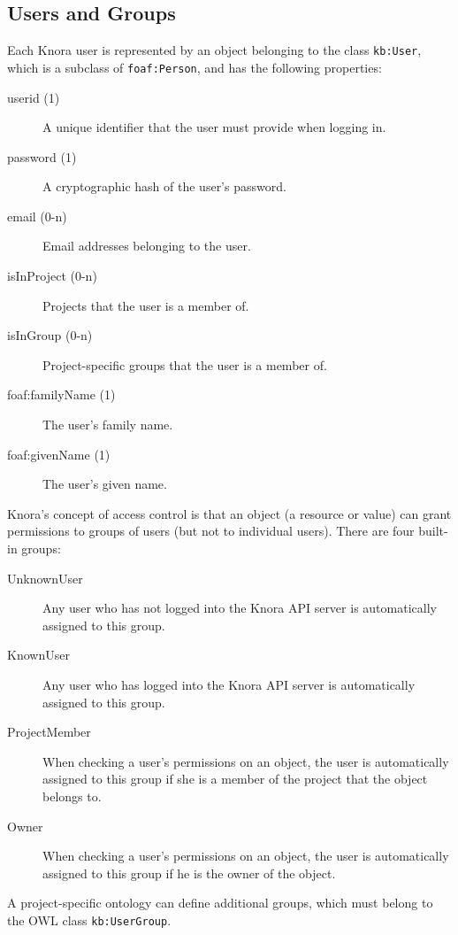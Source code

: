\documentclass[12pt, a4paper]{article}
\begin{document}
\label{sec:authorization}

\subsection{Users and Groups}

\label{subsec:users-and-groups}

Each Knora user is represented by an object belonging to the class \texttt{kb:User}, which is a subclass of \texttt{foaf:Person}, and has the following properties:

\begin{description}
	\item[userid (1)] A unique identifier that the user must provide when logging in.
	\item[password (1)] A cryptographic hash of the user's password.
	\item[email (0-n)] Email addresses belonging to the user.
	\item[isInProject (0-n)] Projects that the user is a member of.
	\item[isInGroup (0-n)] Project-specific groups that the user is a member of.
	\item[foaf:familyName (1)] The user's family name.
	\item[foaf:givenName (1)] The user's given name.
\end{description}

Knora's concept of access control is that an object (a resource or value) can grant permissions to groups of users (but not to individual users). There are four built-in groups:

\begin{description}
	\item[UnknownUser] Any user who has not logged into the Knora API server is automatically assigned to this group.
	\item[KnownUser] Any user who has logged into the Knora API server is automatically assigned to this group.
	\item[ProjectMember] When checking a user's permissions on an object, the user is automatically assigned to this group if she is a member of the project that the object belongs to.
	\item[Owner] When checking a user's permissions on an object, the user is automatically assigned to this group if he is the owner of the object.
\end{description}

A project-specific ontology can define additional groups, which must belong to the OWL class \texttt{kb:UserGroup}.
\end{document}
